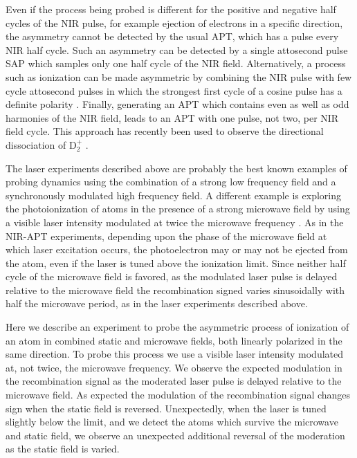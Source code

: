 \documentclass[aps,pra,preprint,groupedaddress]{revtex4-1}
\begin{document}
Even if the process being probed is different for the positive and negative half cycles of the NIR pulse, for example ejection of electrons in a specific direction, the asymmetry cannot be detected by the usual APT, which has a pulse every NIR half cycle. Such an asymmetry can be detected by a single attosecond pulse SAP which samples only one half cycle of the NIR field. Alternatively, a process such as ionization can be made asymmetric by combining the NIR pulse with few cycle attosecond pulses in which the strongest first cycle of a cosine pulse has a definite polarity \cite{Kubel}. Finally, generating an APT which contains even as well as odd harmonies of the NIR field, leads to an APT with one pulse, not two, per NIR field cycle. This approach has recently been used to observe the directional dissociation of D$_2^+$ \cite{Singhl}.

The laser experiments described above are probably the best known examples of probing dynamics using the combination of a strong low frequency field and a synchronously modulated high frequency field. A different example is exploring the photoionization of atoms in the presence of a strong microwave field by using a visible laser intensity modulated at twice the microwave frequency \cite{Overstreet, Carrat}. As in the NIR-APT experiments, depending upon the phase of the microwave field at which laser excitation occurs, the photoelectron may or may not be ejected from the atom, even if the laser is tuned above the ionization limit. Since neither half cycle of the microwave field is favored, as the modulated laser pulse is delayed relative to the microwave field the recombination signed varies sinusoidally with half the microwave period, as in the laser experiments described above.

Here we describe an experiment to probe the asymmetric process of ionization of an atom in combined static and microwave fields, both linearly polarized in the same direction. To probe this process we use a visible laser intensity modulated at, not twice, the microwave frequency. We observe the expected modulation in the recombination signal as the moderated laser pulse is delayed relative to the microwave field. As expected the modulation of the recombination signal changes sign when the static field is reversed. Unexpectedly, when the laser is tuned slightly below the limit, and we detect the atoms which survive the microwave and static field, we observe an unexpected additional reversal of the moderation as the static field is varied.
\end{document}

